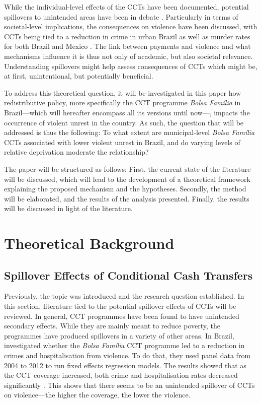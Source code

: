 \documentclass[stu,12pt]{apa7}
\begin{document}
While the individual-level effects of the CCTs have been documented, potential spillovers to unintended areas have been in debate \parencite{gerardCashTransfersFormal2021}. Particularly in terms of societal-level implications, the consequences on violence have been discussed, with CCTs being tied to a reduction in crime in urban Brazil as well as murder rates for both Brazil and Mexico \parencite{chiodaSpilloversConditionalCash2016, lanceConditionalCashTransfers2014}. The link between payments and violence and what mechanisms influence it is thus not only of academic, but also societal relevance. Understanding spillovers might help assess consequences of CCTs which might be, at first, unintentional, but potentially beneficial.

To address this theoretical question, it will be investigated in this paper how redistributive policy, more specifically the CCT programme \textit{Bolsa Família} in Brazil—which will hereafter encompass all its versions until now—, impacts the occurrence of violent unrest in the country. As such, the question that will be addressed is thus the following: To what extent are municipal-level \textit{Bolsa Família} CCTs associated with lower violent unrest in Brazil, and do varying levels of relative deprivation moderate the relationship?

The paper will be structured as follows: First, the current state of the literature will be discussed, which will lead to the development of a theoretical framework explaining the proposed mechanism and the hypotheses. Secondly, the method will be elaborated, and the results of the analysis presented. Finally, the results will be discussed in light of the literature.

\section{Theoretical Background}

\subsection{Spillover Effects of Conditional Cash Transfers}

Previously, the topic was introduced and the research question established. In this section, literature tied to the potential spillover effects of CCTs will be reviewed. In general, CCT programmes have been found to have unintended secondary effects. While they are mainly meant to reduce poverty, the programmes have produced spillovers in a variety of other areas. In Brazil, \textcite{machadoConditionalCashTransfer2018} investigated whether the \textit{Bolsa Famíli}a CCT programme led to a reduction in crimes and hospitalisation from violence. To do that, they used panel data from 2004 to 2012 to run fixed effects regression models. The results showed that as the CCT coverage increased, both crime and hospitalisation rates decreased significantly \parencite{machadoConditionalCashTransfer2018}. This shows that there seems to be an unintended spillover of CCTs on violence—the higher the coverage, the lower the violence.
\end{document}

